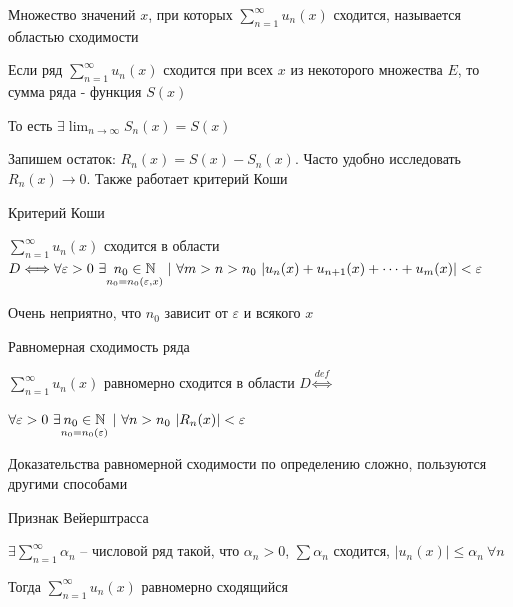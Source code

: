 \documentclass[12pt]{article}
\begin{document}
    \Def Множество значений $x$, при которых $\sum_{n = 1}^\infty u_n(x)$ сходится, называется областью сходимости

    \hypertarget{functionalseriesconvergence}{}

    \Defs Если ряд $\sum_{n = 1}^\infty u_n(x)$ сходится при всех $x$ из некоторого множества $E$, то сумма ряда -
    функция $S(x)$

    \Nota То есть $\exists \lim_{n \to \infty} S_n(x) = S(x)$

    Запишем остаток: $R_n(x) = S(x) - S_n(x)$. Часто удобно исследовать $R_n(x) \to 0$. Также работает критерий Коши

    \begin{MyTheorem}
        \Ths Критерий Коши

        $\sum_{n = 1}^\infty u_n(x)$ сходится в области $D \Longleftrightarrow
        \forall \varepsilon > 0 \ \exists \underset{n_0 = n_0(\varepsilon, x)}{n_0 \in \mathbb{N}} \ | \
        \forall m > n > n_0 \ |u_n(x) + u_{n + 1}(x) + \dots + u_m(x)| < \varepsilon$
    \end{MyTheorem}

    \Notas Очень неприятно, что $n_0$ зависит от $\varepsilon$ и всякого $x$

    \hypertarget{uniformconvergence}{}

    \Def Равномерная сходимость ряда

    $\sum_{n = 1}^\infty u_n(x)$ равномерно сходится в области $D \overset{def}{\Longleftrightarrow}$

    $\forall \varepsilon > 0 \ \exists \underset{n_0 = n_0(\varepsilon)}{n_0 \in \mathbb{N}} \ | \ \forall n > n_0 \ |R_n(x)| < \varepsilon$

    \Nota Доказательства равномерной сходимости по определению сложно, пользуются другими способами

    \hypertarget{weierstrassign}{}

    \begin{MyTheorem}
        \Ths Признак Вейерштрасса

        $\exists \sum_{n = 1}^\infty \alpha_n$ -- числовой ряд такой, что $\alpha_n > 0$, $\sum \alpha_n$ сходится,
        $|u_n(x)| \leq \alpha_n \ \forall n$

        Тогда $\sum_{n = 1}^\infty u_n(x)$ равномерно сходящийся

    \end{MyTheorem}

    \hypertarget{majorseries}{}
\end{document}
